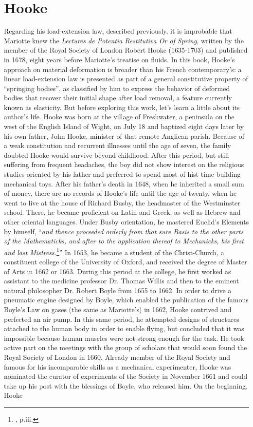 \section{Hooke}

Regarding his load-extension law, described previously, it is improbable that Mariotte knew the \emph{Lectures \emph{de Potentia Restitutiva} Or of Spring}, written by the member of the Royal Society of London Robert Hooke (1635-1703) and published in 1678, eight years before Mariotte's treatise on fluids. In this book, Hooke's approach on material deformation is broader than his French contemporary's: a linear load-extension law is presented as part of a general constitutive property of ``springing bodies'', as classified by him to express the behavior of deformed bodies that recover their initial shape after load removal, a feature currently known as elasticity. But before exploring this work, let's learn a little about its author's life. Hooke was born at the village of Freshwater, a peninsula on the west of the English Island of Wight, on July 18 and baptized eight days later by his own father, John Hooke, minister of that remote Anglican parish. Because of a weak constitution and recurrent illnesses until the age of seven, the family doubted Hooke would survive beyond childhood. After this period, but still suffering from frequent headaches, the boy did not show interest on the religious studies oriented by his father and preferred to spend most of hist time building mechanical toys. After his father's death in 1648, when he inherited a small sum of money, there are no records of Hooke's life until the age of twenty, when he went to live at the house of Richard Busby, the headmaster of the Westminster school. There, he became proficient on Latin and Greek, as well as Hebrew and other oriental languages. Under Busby orientation, he mastered Euclid's Elements by himself, ``\emph{and thence proceeded orderly from that sure Basis to the other parts of the Mathematicks, and after to the application thereof to Mechanicks, his first and last Mistress.}\footnote{\cite{hooke_1705_1}, p.iii.}'' In 1653, he became a student of the Christ-Church, a constituent college of the University of Oxford, and received the degree of Master of Arts in 1662 or 1663. During this period at the college, he first worked as assistant to the medicine professor Dr. Thomas Willis and then to the eminent natural philosopher Dr. Robert Boyle from 1655 to 1662. In order to drive a pneumatic engine designed by Boyle, which enabled the publication of the famous Boyle's Law on gases (the same as Mariotte's) in 1662, Hooke contrived and perfected an air pump. In this same period, he attempted designs of structures attached to the human body in order to enable flying, but concluded that it was impossible because human muscles were not strong enough for the task. He took active part on the meetings with the group of scholars that would soon found the Royal Society of London in 1660. Already member of the Royal Society and famous for his incomparable skills as a mechanical experimenter, Hooke was nominated the curator of experiments of the Society in November 1661 and could take up his post with the blessings of Boyle, who released him. On the beginning, Hooke 